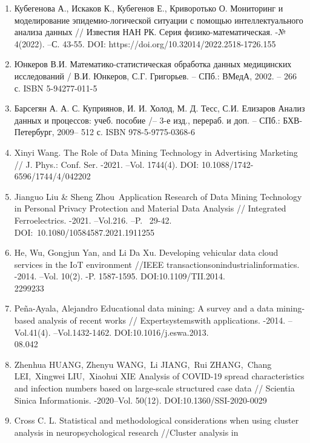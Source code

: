 \begin{noparindent}

\begin{enumerate}
\def\labelenumi{\arabic{enumi}.}
\item
  Кубегенова А., Искаков К., Кубегенов Е., Криворотько О. Мониторинг и
  моделирование эпидемио-логической ситуации с помощью интеллектуального
  анализа данных // Известия НАН РК. Серия физико-математическая. -№
  4(2022). --С. 43-55. DOI: https://doi.org/10.32014/2022.2518-1726.155
\item
  Юнкеров В.И. Математико-статистическая обработка данных медицинских
  исследований / В.И. Юнкеров, С.Г. Григорьев. -- СПб.: ВМедА, 2002. --
  266 с. ISBN 5-94277-011-5
\item
  Барсегян А. А. С. Куприянов, И. И. Холод, М. Д. Тесс, С.И. Елизаров
  Анализ данных и процессов: учеб. пособие /-- 3-е изд., перераб. и доп.
  -- СПб.: БХВ-Петербург, 2009-- 512 с. ISBN 978-5-9775-0368-6
\item
  Xinyi Wang. The Role of Data Mining Technology in Advertising
  Marketing // J. Phys.: Conf. Ser. -2021. --Vol. 1744(4). DOI:
  10.1088/1742-6596/1744/4/042202
\item
  Jianguo Liu \& Sheng Zhou~Application Research of Data Mining
  Technology in Personal Privacy Protection and Material Data Analysis
  // Integrated Ferroelectrics. -2021. --Vol.216. --P. ~29-42.
 \\DOI:~10.1080/10584587.2021.1911255
\item
  He, Wu, Gongjun Yan, and Li Da Xu. Developing vehicular data cloud
  services in the IoT environment //IEEE
  transactionsonindustrialinformatics. -2014. --Vol. 10(2). -P.
  1587-1595. DOI:10.1109/TII.2014.\\2299233
\item
  Peña-Ayala, Alejandro Educational data mining: A survey and a data
  mining-based analysis of recent works // Expertsystemswith
  applications. -2014. --Vol.41(4). --Vol.1432-1462.
  DOI:10.1016/j.eswa.2013.\\08.042
\item
  Zhenhua HUANG, Zhenyu WANG,~Li JIANG,~Rui ZHANG,~Chang LEI,~Xingwei
  LIU,~Xiaohui XIE Analysis of COVID-19 spread characteristics and
  infection numbers based on large-scale structured case data //
  Scientia Sinica Informationis. -2020--Vol. 50(12).
  DOI:10.1360/SSI-2020-0029
\item
  Cross C. L. Statistical and methodological considerations when using
  cluster analysis in neuropsychological research //Cluster analysis in

\end{enumerate}
\end{noparindent}
